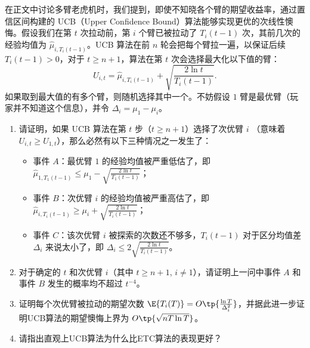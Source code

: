 \begin{problem}
在正文中讨论多臂老虎机时，我们提到，即使不知晓各个臂的期望收益率，通过置信区间构建的 UCB（Upper Confidence Bound）算法能够实现更优的次线性懊悔。假设我们在第 $t$ 次拉动前，第 $i$ 个臂已被拉动了 $T_i(t-1)$ 次，其前几次的经验均值为 $\hat{\mu}_{i, T_i(t-1)}$。UCB 算法在前 $n$ 轮会把每个臂拉一遍，以保证后续 $T_i(t-1)>0$，对于 $t\geq n+1$，算法在第 $t$ 次会选择最大化以下值的臂：
\[
    U_{i,t} = \hat{\mu}_{i, T_i(t-1)} + \sqrt{\frac{2\ln t}{T_i(t-1)}}.
\]
如果取到最大值的有多个臂，则随机选择其中一个。不妨假设 $1$ 臂是最优臂（玩家并不知道这个信息），并令 $\Delta_i=\mu_1-\mu_i$。
\begin{enumerate}
    \item 请证明，如果 UCB 算法在第 $t$ 步（$t\ge n+1$）选择了次优臂 $i$ （意味着 $U_{i,t} \geq U_{1,t}$），那么必然有以下三种情况之一发生了：
    \begin{itemize}
        \item 事件 $A$：最优臂 $1$ 的经验均值被严重低估了，即 $\hat{\mu}_{1, T_1(t-1)} \le \mu_1 - \sqrt{\frac{2\ln t}{T_1(t-1)}}$；
        \item 事件 $B$：次优臂 $i$ 的经验均值被严重高估了，即 $\hat{\mu}_{i, T_i(t-1)} \ge \mu_i + \sqrt{\frac{2\ln t}{T_i(t-1)}}$；
        \item 事件 $C$：该次优臂 $i$ 被探索的次数还不够多，$T_i(t-1)$ 对于区分均值差 $\Delta_i$ 来说太小了，即 $\Delta_i \leq 2\sqrt{\frac{2\ln t}{T_i(t-1)}}$。
    \end{itemize}
    \item 对于确定的 $t$ 和次优臂 $i$（其中 $t\ge n+1$, $i\neq 1$），请证明上一问中事件 $A$ 和事件 $B$ 发生的概率均不超过 $t^{-4}$。
    \item 证明每个次优臂被拉动的期望次数 $\E{T_i(T)} = O\tp{\frac{\ln T}{\Delta_i^2}}$，并据此进一步证明UCB算法的期望懊悔上界为 $O\tp{\sqrt{nT\ln T}}$。
    \item 请指出直观上UCB算法为什么比ETC算法的表现更好？
\end{enumerate}
\end{problem}
